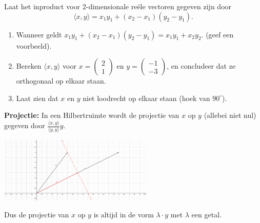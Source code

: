 \documentclass[../main.tex]{subfiles}
\begin{document}
\begin{opdracht}
Laat het inproduct voor 2-dimensionale reële vectoren gegeven zijn door $$\langle x,y\rangle=x_1y_1+(x_2-x_1)(y_2-y_1).$$
\begin{enumerate}

\item Wanneer geldt $x_1y_1+(x_2-x_1)(y_2-y_1)=x_1y_1+x_2y_2$. (geef een voorbeeld).
\item Bereken $\langle x,y\rangle$ voor $x=\begin{pmatrix}2\\1\end{pmatrix}$ en $y=\begin{pmatrix}-1\\-3\end{pmatrix}$, en concludeer dat ze orthogonaal op elkaar staan.
\item Laat zien dat $x$ en $y$ niet loodrecht op elkaar staan (hoek van $90^\circ$).
\end{enumerate}
\end{opdracht}

\textbf{Projectie:} In een Hilbertruimte wordt de projectie van $x$ op $y$ (allebei niet nul) gegeven door $\frac{\langle x,y\rangle}{\langle y,y\rangle}y$.

\begin{center}

    \includegraphics[width=0.55\textwidth]{./img/projectie 1.png}
\end{center}
\vspace{.5cm}

Dus de projectie van $x$ op $y$ is altijd in de vorm $\lambda\cdot y$ met $\lambda$ een getal.
\end{document}
